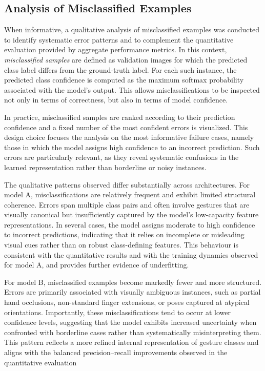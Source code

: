 \documentclass{article}
\begin{document}
\subsection{Analysis of Misclassified Examples}

When informative, a qualitative analysis of misclassified examples was
conducted to identify systematic error patterns and to complement the
quantitative evaluation provided by aggregate performance metrics. In
this context, \emph{misclassified samples} are defined as validation
images for which the predicted class label differs from the ground-truth
label. For each such instance, the predicted class confidence is
computed as the maximum softmax probability associated with the model's
output. This allows misclassifications to be inspected not only in terms
of correctness, but also in terms of model confidence.

In practice, misclassified samples are ranked according to their
prediction confidence and a fixed number of the most confident errors is
visualized. This design choice focuses the analysis on the most
informative failure cases, namely those in which the model assigns high
confidence to an incorrect prediction. Such errors are particularly
relevant, as they reveal systematic confusions in the learned
representation rather than borderline or noisy instances.

The qualitative patterns observed differ substantially across
architectures. For model A, misclassifications are relatively frequent
and exhibit limited structural coherence. Errors span multiple class
pairs and often involve gestures that are visually canonical but
insufficiently captured by the model's low-capacity feature
representations. In several cases, the model assigns moderate to high
confidence to incorrect predictions, indicating that it relies on
incomplete or misleading visual cues rather than on robust
class-defining features. This behaviour is consistent with the
quantitative results and with the training dynamics observed for model
A, and provides further evidence of underfitting.

For model B, misclassified examples become markedly fewer and more
structured. Errors are primarily associated with visually ambiguous
instances, such as partial hand occlusions, non-standard finger
extensions, or poses captured at atypical orientations. Importantly,
these misclassifications tend to occur at lower confidence levels,
suggesting that the model exhibits increased uncertainty when confronted
with borderline cases rather than systematically misinterpreting them.
This pattern reflects a more refined internal representation of gesture
classes and aligns with the balanced precision--recall improvements
observed in the quantitative evaluation
\end{document}
